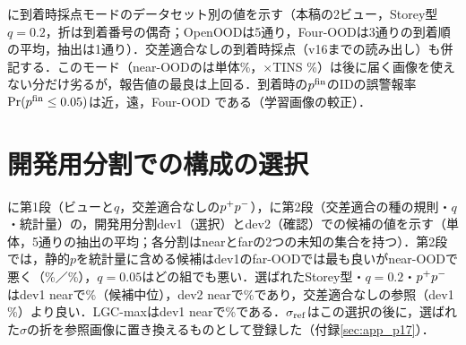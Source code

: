に到着時採点モードのデータセット別の値を示す（本稿の2ビュー，Storey型$q{=}0.2$，折は到着番号の偶奇；OpenOODは5通り，Four-OODは3通りの到着順の平均，抽出は1通り）．交差適合なしの到着時採点（v16までの読み出し）も併記する．このモード（near-OODの\FPR{}は単体\NOnlOneFourNoneNearFpr\%，$\times$TINS \NOnlOneFourTinsNearFpr\%）は後に届く画像を使えない分だけ劣るが，報告値の最良は上回る．到着時の$\pfin$のIDの誤警報率$\Pr(p^{\mathrm{fin}}\le0.05)$は近\NOnlOneFourValNearFprZeroZeroFive{}，遠\NOnlOneFourValFarFprZeroZeroFive{}，Four-OOD \NOnlOneFourValFourFprZeroZeroFive{}である（学習画像の較正）．

\begin{table}[htbp]
\centering
\caption{到着時採点モードのデータセット別の値（[\%]，AUROC／FPR95）．}
\label{tab:online}
\vspace{1.5mm}

\end{table}

\section{開発用分割での構成の選択}
\label{sec:app_sel}
に第1段（ビューと$q$，交差適合なしの$\pP\pN$），に第2段（交差適合の種の規則・$q$・統計量）の，開発用分割dev1（選択）とdev2（確認）での候補の値を示す（単体，5通りの抽出の平均；各分割はnearとfarの2つの未知の集合を持つ）．第2段では，静的$p$を統計量に含める候補はdev1のfar-OODでは最も良いがnear-OODで悪く（\NSelqDevOnePpsNearFpr\%／\NSelqDevOnePpsFarFpr\%），$q{=}0.05$はどの組でも悪い．選ばれたStorey型・$q{=}0.2$・$\pP\pN$はdev1 nearで\NSelqDevOneNearFpr\%（\NSelqNCandidates{}候補中\NSelqDevOneRankOfChosen{}位），dev2 nearで\NSelqDevTwoNearFpr\%であり，交差適合なしの参照（dev1 \NSelqRefDevOneNearFpr\%）より良い．LGC-maxはdev1 nearで\NSelqDevOneLgcNearFpr\%である．$\sigma_{\mathrm{ref}}$はこの選択の後に，選ばれた$\sigma$の折を参照画像に置き換えるものとして登録した（付録\ref{sec:app_p17}）．

\begin{table}[htbp]
\centering
\caption{第1段の候補（ビューと$q$；[\%]，交差適合なしの$\pP\pN$，単体，5通りの抽出の平均）．\textcolor{sotacol}{$\bigstar$}は列の最良値．}
\label{tab:sel}
\vspace{1.5mm}

\end{table}

\begin{table}[htbp]
\centering
\caption{第2段の候補（交差適合の種の規則・$q$・統計量；[\%]，$\pfin$，単体，5通りの抽出の平均，折は3通りの割り当ての平均）と参照．\textcolor{sotacol}{$\bigstar$}は列の最良値．}
\label{tab:selq}
\vspace{1.5mm}

\end{table}

